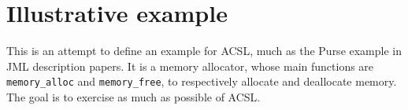 \documentclass[a4paper,11pt,twoside,openright]{report}
\begin{document}




\section{Illustrative example}

This is an attempt to define an example for ACSL, much as the Purse
example in JML description papers.  It is a memory allocator, whose
main functions are \verb|memory_alloc| and \verb|memory_free|, to
respectively allocate and deallocate memory.  The goal is to exercise
as much as possible of ACSL.



\cleardoublepage
{}

%


\cleardoublepage
{}
\listoffigures

\cleardoublepage
{}
\printindex
\end{document}
